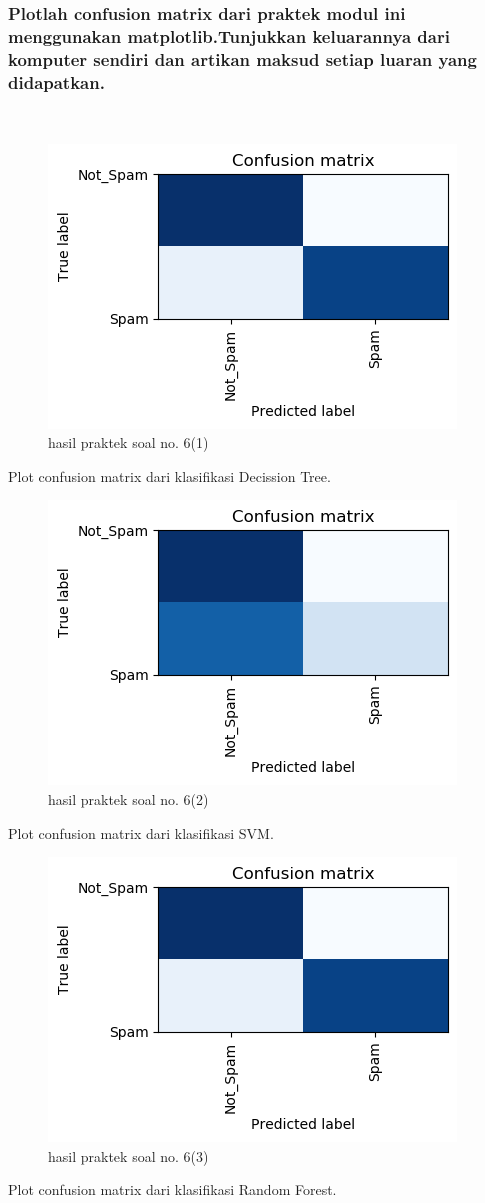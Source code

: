 \subsubsection{Plotlah confusion matrix dari praktek modul ini menggunakan matplotlib.Tunjukkan keluarannya dari komputer sendiri dan artikan maksud setiap luaran yang didapatkan.}
\hfill\\

	\begin{figure}[H]
	\centering
		\includegraphics[width=8 cm]{figures/1174083/figures4/13.png}
	\caption{hasil praktek soal no. 6(1)}
	\end{figure}
	Plot confusion matrix dari klasifikasi Decission Tree.

	\begin{figure}[H]
	\centering
		\includegraphics[width=8 cm]{figures/1174083/figures4/14.png}
	\caption{hasil praktek soal no. 6(2)}
	\end{figure}
	Plot confusion matrix dari klasifikasi SVM.

	\begin{figure}[H]
	\centering
		\includegraphics[width=8 cm]{figures/1174083/figures4/15.png}
	\caption{hasil praktek soal no. 6(3)}
	\end{figure}
	Plot confusion matrix dari klasifikasi Random Forest.
	
